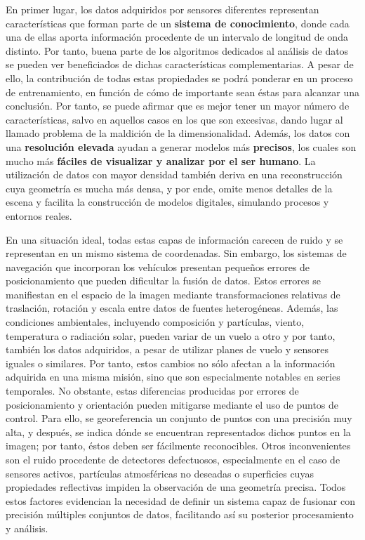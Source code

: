 En primer lugar, los datos adquiridos por sensores diferentes representan características que forman parte de un \textbf{sistema de conocimiento}, donde cada una de ellas aporta información procedente de un intervalo de longitud de onda distinto. Por tanto, buena parte de los algoritmos dedicados al análisis de datos se pueden ver beneficiados de dichas características complementarias. A pesar de ello, la contribución de todas estas propiedades se podrá ponderar en un proceso de entrenamiento, en función de cómo de importante sean éstas para alcanzar una conclusión. Por tanto, se puede afirmar que es mejor tener un mayor número de características, salvo en aquellos casos en los que son excesivas, dando lugar al llamado problema de la maldición de la dimensionalidad. Además, los datos con una \textbf{resolución elevada} ayudan a generar modelos más \textbf{precisos}, los cuales son mucho más \textbf{fáciles de visualizar y analizar por el ser humano}. La utilización de datos con mayor densidad también deriva en una reconstrucción cuya geometría es mucha más densa, y por ende, omite menos detalles de la escena y facilita la construcción de modelos digitales, simulando procesos y entornos reales. 

En una situación ideal, todas estas capas de información carecen de ruido y se representan en un mismo sistema de coordenadas. Sin embargo, los sistemas de navegación que incorporan los vehículos presentan pequeños errores de posicionamiento que pueden dificultar la fusión de datos. Estos errores se manifiestan en el espacio de la imagen mediante transformaciones relativas de traslación, rotación y escala entre datos de fuentes heterogéneas. Además, las condiciones ambientales, incluyendo composición y partículas, viento, temperatura o radiación solar, pueden variar de un vuelo a otro y por tanto, también los datos adquiridos, a pesar de utilizar planes de vuelo y sensores iguales o similares. Por tanto, estos cambios no sólo afectan a la información adquirida en una misma misión, sino que son especialmente notables en series temporales. No obstante, estas diferencias producidas por errores de posicionamiento y orientación pueden mitigarse mediante el uso de puntos de control. Para ello, se georeferencia un conjunto de puntos con una precisión muy alta, y después, se indica dónde se encuentran representados dichos puntos en la imagen; por tanto, éstos deben ser fácilmente reconocibles. Otros inconvenientes son el ruido procedente de detectores defectuosos, especialmente en el caso de sensores activos, partículas atmosféricas no deseadas o superficies cuyas propiedades reflectivas impiden la observación de una geometría precisa. Todos estos factores evidencian la necesidad de definir un sistema capaz de fusionar con precisión múltiples conjuntos de datos, facilitando así su posterior procesamiento y análisis.

